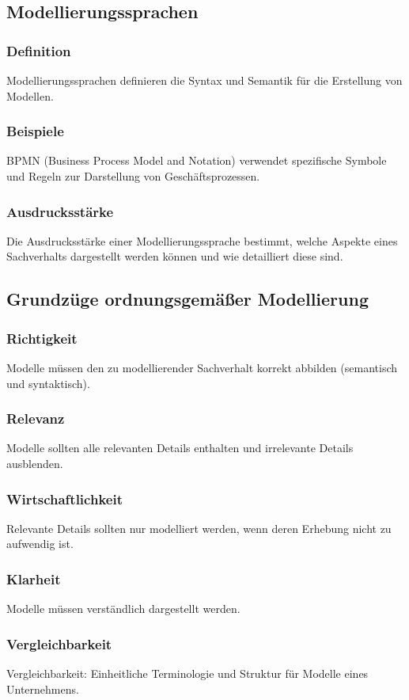 \subsection{Modellierungssprachen}
    \subsubsection*{Definition}
        Modellierungssprachen definieren die Syntax und Semantik für die Erstellung von Modellen.
    \subsubsection*{Beispiele}
        BPMN (Business Process Model and Notation) verwendet spezifische Symbole und Regeln zur Darstellung von Geschäftsprozessen.
    \subsubsection*{Ausdrucksstärke}
        Die Ausdrucksstärke einer Modellierungssprache bestimmt, welche Aspekte eines Sachverhalts dargestellt werden können und wie detailliert diese sind.

\subsection{Grundzüge ordnungsgemäßer Modellierung}
    \subsubsection*{Richtigkeit}
        Modelle müssen den zu modellierender Sachverhalt korrekt abbilden (semantisch und syntaktisch).
    \subsubsection*{Relevanz}
        Modelle sollten alle relevanten Details enthalten und irrelevante Details ausblenden.
    \subsubsection*{Wirtschaftlichkeit}
        Relevante Details sollten nur modelliert werden, wenn deren Erhebung nicht zu aufwendig ist.
    \subsubsection*{Klarheit}
        Modelle müssen verständlich dargestellt werden.
    \subsubsection*{Vergleichbarkeit}
        Vergleichbarkeit: Einheitliche Terminologie und Struktur für Modelle eines Unternehmens.
